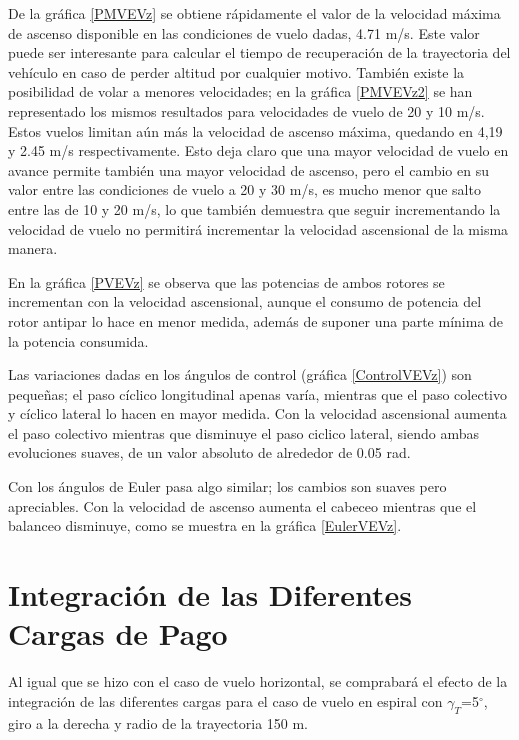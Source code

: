 De la gráfica \ref{PMVEVz} se obtiene rápidamente el valor de la velocidad máxima de ascenso disponible en las condiciones de vuelo dadas, 4.71 m/s. Este valor puede ser interesante para calcular el tiempo de recuperación de la trayectoria del vehículo en caso de perder altitud por cualquier motivo.
También existe la posibilidad de volar a menores velocidades; en la gráfica \ref{PMVEVz2} se han representado los mismos resultados para velocidades de vuelo de 20 y 10 m/s. Estos vuelos limitan aún más la velocidad de ascenso máxima, quedando en 4,19 y 2.45 m/s respectivamente. Esto deja claro que una mayor velocidad de vuelo en avance permite también una mayor velocidad de ascenso, pero el cambio en su valor entre las condiciones de vuelo a 20 y 30 m/s, es mucho menor que salto entre las de 10 y 20 m/s, lo que también demuestra que seguir incrementando la velocidad de vuelo no permitirá incrementar la velocidad ascensional de la misma manera.

En la gráfica \ref{PVEVz} se observa que las potencias de ambos rotores se incrementan con la velocidad ascensional, aunque el consumo de potencia del rotor antipar lo hace en menor medida, además de suponer una parte mínima de la potencia consumida.

Las variaciones dadas en los ángulos de control (gráfica \ref{ControlVEVz}) son pequeñas; el paso cíclico longitudinal apenas varía, mientras que el paso colectivo y cíclico lateral lo hacen en mayor medida. Con la velocidad ascensional aumenta el paso colectivo mientras que disminuye el paso ciclico lateral, siendo ambas evoluciones suaves, de un valor absoluto de alrededor de 0.05 rad.

Con los ángulos de Euler pasa algo similar; los cambios son suaves pero apreciables. Con la velocidad de ascenso aumenta el cabeceo mientras que el balanceo disminuye, como se muestra en la gráfica \ref{EulerVEVz}.

\section{Integración de las Diferentes Cargas de Pago}

Al igual que se hizo con el caso de vuelo horizontal, se comprabará el efecto de la integración de las diferentes cargas para el caso de vuelo en espiral con $\gamma_T$=5$^\circ$, giro a la derecha y radio de la trayectoria 150 m.

